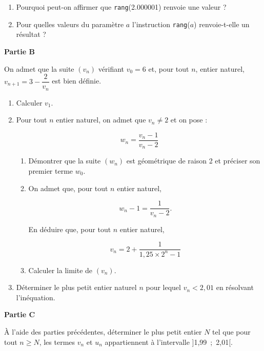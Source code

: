 \begin{enumerate}
	\begin{enumerate}
		\item Pourquoi peut-on affirmer que \texttt{rang}(2.000001) renvoie une valeur ?
		\item Pour quelles valeurs du paramètre $a$ l'instruction \texttt{rang}($a$) renvoie-t-elle un résultat ?
	\end{enumerate}
\end{enumerate}

\bigskip

\textbf{Partie B}

\medskip

On admet que la suite $\left(v_n\right)$ vérifiant $v_0 = 6$ et, pour tout $n$, entier naturel, $v_{n+1} = 3 - \dfrac{2}{v_n}$ est bien définie.

\medskip

\begin{enumerate}
\item Calculer $v_1$.
\item Pour tout $n$ entier naturel, on admet que $v_n \ne 2$ et on pose :

\[w_n = \dfrac{v_n - 1}{v_n - 2}\]

	\begin{enumerate}
		\item Démontrer que la suite $\left(w_n\right)$ est géométrique de raison 2 et préciser son premier terme $w_0$.
		\item On admet que, pour tout $n$ entier naturel,

\[w_n - 1 = \dfrac{1}{v_n - 2}.\]

En déduire que, pour tout $n$ entier naturel,

\[v_n = 2 + \dfrac{1}{1,25 \times 2^n - 1}\]

		\item Calculer la limite de $\left(v_n\right)$.
	\end{enumerate}
\item Déterminer le plus petit entier naturel $n$ pour lequel $v_n < 2,01$ en résolvant
l'inéquation.
\end{enumerate}

\bigskip

\textbf{Partie C}

\medskip

À l'aide des parties précédentes, déterminer le plus petit entier $N$ tel que pour tout $n \geqslant N$, les termes $v_n$ et $u_n$ appartiennent à l'intervalle ]1,99~;~2,01[.

\bigskip

